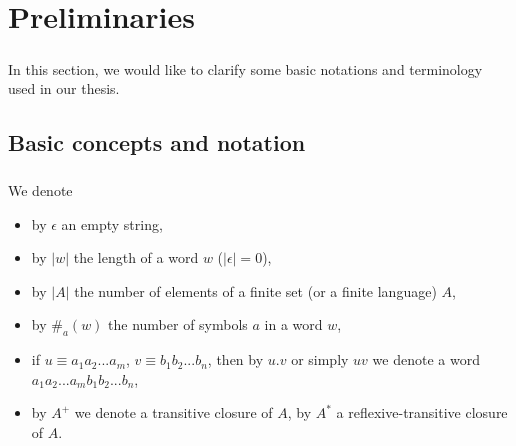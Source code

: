 \chapter{Preliminaries}
\label{chap:Preliminaries}

\paragraph{}
In this section, we would like to clarify some basic notations and terminology used in our thesis.

\section{Basic concepts and notation}




\paragraph{}
\oznacenie We denote 
\begin{itemize}
\item by $\epsilon $ an empty string,
\item by $|w|$ the length of a word $w$ ($|\epsilon |=0$),
\item by $|A|$ the number of elements of a finite set (or a finite language) $A$,
\item by $\# _{a}(w)$ the number of symbols $a$ in a word $w$,
\item if $u \equiv a_{1}a_{2}...a_{m}$, $v \equiv b_{1}b_{2}...b_{n}$, then by $u.v$ or simply $uv$ we denote a word $a_{1}a_{2}...a_{m}b_{1}b_{2}...b_{n}$,
\item by $A^{+}$ we denote a transitive closure of $A$, by $A^{*}$ a reflexive-transitive closure of $A$.
\end{itemize}

